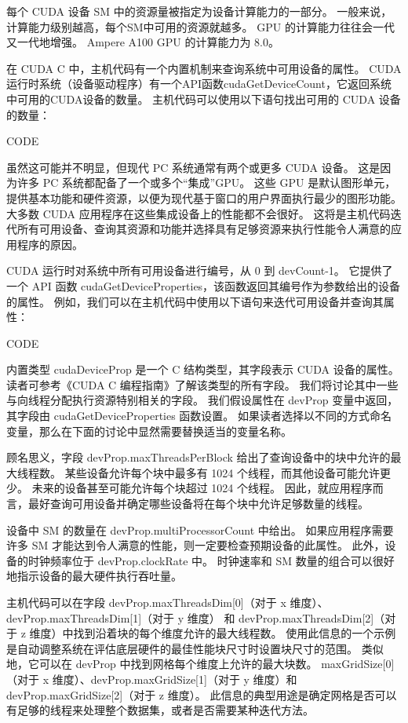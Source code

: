 每个 CUDA 设备 SM 中的资源量被指定为设备计算能力的一部分。 一般来说，计算能力级别越高，每个SM中可用的资源就越多。 
GPU 的计算能力往往会一代又一代地增强。 Ampere A100 GPU 的计算能力为 8.0。

在 CUDA C 中，主机代码有一个内置机制来查询系统中可用设备的属性。 
CUDA运行时系统（设备驱动程序）有一个API函数cudaGetDeviceCount，它返回系统中可用的CUDA设备的数量。 
主机代码可以使用以下语句找出可用的 CUDA 设备的数量：

{\color{red} CODE}

虽然这可能并不明显，但现代 PC 系统通常有两个或更多 CUDA 设备。 这是因为许多 PC 系统都配备了一个或多个“集成”GPU。 
这些 GPU 是默认图形单元，提供基本功能和硬件资源，以便为现代基于窗口的用户界面执行最少的图形功能。 
大多数 CUDA 应用程序在这些集成设备上的性能都不会很好。 
这将是主机代码迭代所有可用设备、查询其资源和功能并选择具有足够资源来执行性能令人满意的应用程序的原因。

CUDA 运行时对系统中所有可用设备进行编号，从 0 到 devCount-1。 
它提供了一个 API 函数 cudaGetDeviceProperties，该函数返回其编号作为参数给出的设备的属性。 
例如，我们可以在主机代码中使用以下语句来迭代可用设备并查询其属性：

{\color{red} CODE}

内置类型 cudaDeviceProp 是一个 C 结构类型，其字段表示 CUDA 设备的属性。 
读者可参考《CUDA C 编程指南》了解该类型的所有字段。 我们将讨论其中一些与向线程分配执行资源特别相关的字段。 
我们假设属性在 devProp 变量中返回，其字段由 cudaGetDeviceProperties 函数设置。 
如果读者选择以不同的方式命名变量，那么在下面的讨论中显然需要替换适当的变量名称。

顾名思义，字段 devProp.maxThreadsPerBlock 给出了查询设备中的块中允许的最大线程数。 
某些设备允许每个块中最多有 1024 个线程，而其他设备可能允许更少。 未来的设备甚至可能允许每个块超过 1024 个线程。 
因此，就应用程序而言，最好查询可用设备并确定哪些设备将在每个块中允许足够数量的线程。

设备中 SM 的数量在 devProp.multiProcessorCount 中给出。 
如果应用程序需要许多 SM 才能达到令人满意的性能，则一定要检查预期设备的此属性。 
此外，设备的时钟频率位于 devProp.clockRate 中。 时钟速率和 SM 数量的组合可以很好地指示设备的最大硬件执行吞吐量。

主机代码可以在字段 devProp.maxThreadsDim[0]（对于 x 维度）、
devProp.maxThreadsDim[1]（对于 y 维度）
和 devProp.maxThreadsDim[2]（对于 z 维度）中找到沿着块的每个维度允许的最大线程数。 
使用此信息的一个示例是自动调整系统在评估底层硬件的最佳性能块尺寸时设置块尺寸的范围。 
类似地，它可以在 devProp 中找到网格每个维度上允许的最大块数。 
maxGridSize[0]（对于 x 维度）、devProp.maxGridSize[1]（对于 y 维度）和 devProp.maxGridSize[2]（对于 z 维度）。 
此信息的典型用途是确定网格是否可以有足够的线程来处理整个数据集，或者是否需要某种迭代方法。


